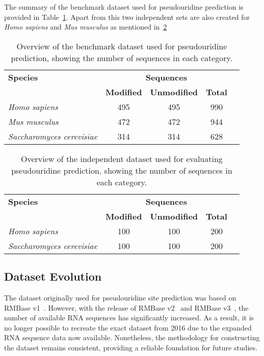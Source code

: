     The summary of the benchmark dataset used for pseudouridine prediction is provided in Table~\ref{tab:dataset}.
    Apart from this two independent sets are also created for \textit{Homo sapiens} and \textit{Mus musculus} as mentioned in~\ref{tab:independent-dataset}

    \begin{table}[ht]
      \centering
      \begin{tabular}{@{}lcccc@{}}
        \toprule
        \textbf{Species} & \multicolumn{3}{c}{\textbf{Sequences}} \\
        \cmidrule(lr){2-4}
        & \textbf{Modified} & \textbf{Unmodified} & \textbf{Total} & \textbf{} \\
        \midrule
        \textit{Homo sapiens} & 495 & 495 & 990 \\
        \textit{Mus musculus} & 472 & 472 & 944 \\
        \textit{Saccharomyces cerevisiae} & 314 & 314 & 628 \\
        \bottomrule
      \end{tabular}
      \caption{Overview of the benchmark dataset used for pseudouridine prediction, showing the number of sequences in each category.}

      \label{tab:dataset}
    \end{table}

    \begin{table}[ht]
      \centering
      \begin{tabular}{@{}lcccc@{}}
        \toprule
        \textbf{Species} & \multicolumn{3}{c}{\textbf{Sequences}} \\
        \cmidrule(lr){2-4}
        & \textbf{Modified} & \textbf{Unmodified} & \textbf{Total} & \textbf{} \\
        \midrule
        \textit{Homo sapiens} & 100 & 100 & 200 \\
        \textit{Saccharomyces cerevisiae} & 100 & 100 & 200 \\
        \bottomrule
      \end{tabular}
      \caption{Overview of the independent dataset used for evaluating pseudouridine prediction, showing the number of sequences in each category.}
      \label{tab:independent-dataset}
    \end{table}

  \subsection{Dataset Evolution}\label{subsec:dataset-evolution}
    The dataset originally used for pseudouridine site prediction was based on RMBase v1~\cite{sun_rmbase_2016}.
    However, with the release of RMBase v2~\cite{xuan_rmbase_2018} and RMBase v3~\cite{xuan_rmbase_2024}, the number of available RNA sequences has significantly increased.
    As a result, it is no longer possible to recreate the exact dataset from 2016 due to the expanded RNA sequence data now available.
    Nonetheless, the methodology for constructing the dataset remains consistent, providing a reliable foundation for future studies.